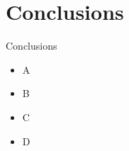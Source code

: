 \section{Conclusions}\label{sec:conclusions}

\begin{frame}{Conclusions}

\begin{itemize}
    \item A
    \item B
    \item C
    \item D
\end{itemize}

\end{frame}